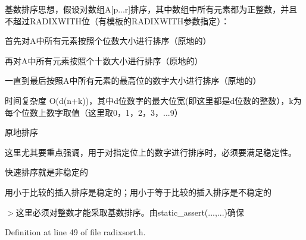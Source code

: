 \begin{DoxyItemize}
\item 基数排序思想，假设对数组\+A\mbox{[}p...r\mbox{]}排序，其中数组中所有元素都为正整数，并且不超过\+R\+A\+D\+I\+X\+W\+I\+T\+H位（有模板的\+R\+A\+D\+I\+X\+W\+I\+T\+H参数指定）：
\begin{DoxyItemize}
\item 首先对\+A中所有元素按照个位数大小进行排序（原地的）
\item 再对\+A中所有元素按照个十数大小进行排序（原地的）
\item 一直到最后按照\+A中所有元素的最高位的数字大小进行排序（原地的）
\end{DoxyItemize}
\item 时间复杂度 O(d(n+k))，其中d位数字的最大位宽(即这里都是d位数的整数），k为每个位数上数字取值（这里取0，1，2，3，...9）
\item 原地排序

这里尤其要重点强调，用于对指定位上的数字进行排序时，必须要满足稳定性。
\begin{DoxyItemize}
\item 快速排序就是非稳定的
\item 用小于比较的插入排序是稳定的；用小于等于比较的插入排序是不稳定的
\end{DoxyItemize}
\end{DoxyItemize}

$>$这里必须对整数才能采取基数排序。由static\+\_\+assert(...,...)确保 

Definition at line 49 of file radixsort.\+h.

